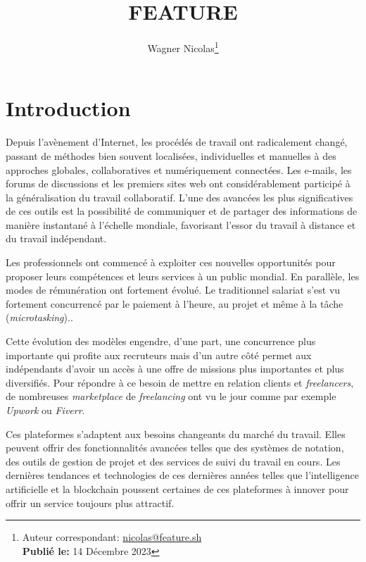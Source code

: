 \documentclass[
	a4paper, %
	10pt, %
	unnumberedsections, %
	twoside, %
]{LTJournalArticle}
\title{FEATURE} %
\author{%
	Wagner Nicolas\thanks{Auteur correspondant: \href{mailto:nicolas@feature.sh}{nicolas@feature.sh}\\ \textbf{Publié le:} 14 Décembre 2023}
}
\begin{document}
\maketitle %


\section{Introduction}

Depuis l'avènement d'Internet, les procédés de travail ont radicalement changé, passant de méthodes bien souvent localisées, individuelles et manuelles à des approches globales, collaboratives et numériquement connectées. Les e-mails, les forums de discussions et les premiers sites web ont considérablement participé à
la généralisation du travail collaboratif. L'une des avancées les plus significatives de ces outils est la possibilité de communiquer et de partager des informations de manière instantané à l'échelle mondiale, favorisant l'essor du travail à distance et du travail indépendant.

Les professionnels ont commencé à exploiter ces nouvelles opportunités pour proposer leurs compétences et leurs services à un public mondial. En parallèle, les modes de rémunération ont fortement évolué. Le traditionnel salariat s'est vu fortement concurrencé par le
paiement à l'heure, au projet et même à la tâche (\emph{microtasking})..

Cette évolution des modèles engendre, d'une part, une concurrence plus importante qui profite aux recruteurs mais d'un autre côté permet aux indépendants d'avoir un accès à une offre de missions plus importantes et plus diversifiés. Pour répondre à ce besoin de mettre en relation clients et \emph{freelancers}, de nombreuses \emph{marketplace} de \emph{freelancing} ont vu le jour comme par exemple \emph{Upwork} ou \emph{Fiverr}.

Ces plateformes s'adaptent aux besoins changeants du marché du travail. Elles peuvent offrir des fonctionnalités avancées telles que des systèmes de notation, des outils de gestion de projet et des services de suivi du travail en cours. Les dernières tendances et technologies de ces dernières années telles que l'intelligence artificielle et la blockchain poussent certaines de ces plateformes à innover pour offrir un service toujours plus attractif.
\end{document}
